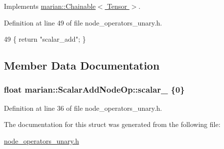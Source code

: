 Implements \hyperlink{classmarian_1_1Chainable_a2b7a5cbdac7a7d3bd7d781a6ff148fc3}{marian\+::\+Chainable$<$ Tensor $>$}.



Definition at line 49 of file node\+\_\+operators\+\_\+unary.\+h.


\begin{DoxyCode}
49 \{ \textcolor{keywordflow}{return} \textcolor{stringliteral}{"scalar\_add"}; \}
\end{DoxyCode}


\subsection{Member Data Documentation}
\subsubsection[{\texorpdfstring{scalar\+\_\+}{scalar_}}]{\setlength{\rightskip}{0pt plus 5cm}float marian\+::\+Scalar\+Add\+Node\+Op\+::scalar\+\_\+ \{0\}\hspace{0.3cm}{\ttfamily [private]}}\hypertarget{structmarian_1_1ScalarAddNodeOp_a57f5dd8c7cc7757fc13924f0d97a22c3}{}\label{structmarian_1_1ScalarAddNodeOp_a57f5dd8c7cc7757fc13924f0d97a22c3}


Definition at line 36 of file node\+\_\+operators\+\_\+unary.\+h.



The documentation for this struct was generated from the following file\+:\begin{DoxyCompactItemize}
\item 
\hyperlink{node__operators__unary_8h}{node\+\_\+operators\+\_\+unary.\+h}\end{DoxyCompactItemize}
